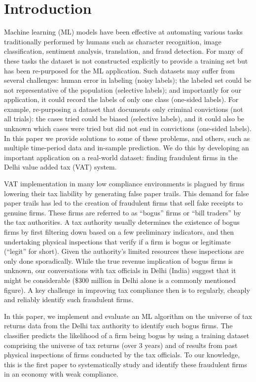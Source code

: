 \section{Introduction}
\label{sec:2-introduction}
Machine learning (ML) models have been effective at automating various tasks traditionally performed by humans such as character recognition, image classification, sentiment analysis, translation, and fraud detection. For many of these tasks the dataset is not constructed explicitly to provide a training set but has been re-purposed for the ML application. Such datasets may suffer from several challenges: human error in labeling (noisy labels); the labeled set could be not representative of the population (selective labels); and importantly for our application, it could record the labels of only one class (one-sided labels). For example, re-purposing a dataset that documents only criminal convictions (not all trials): the cases tried could be biased (selective labels), and it could also be unknown which cases were tried but did not end in convictions (one-sided labels). In this paper we provide solutions to some of these problems, and others, such as multiple time-period data and in-sample prediction. We do this by developing an important application on a real-world dataset: finding fraudulent firms in the Delhi value added tax (VAT) system.

VAT implementation in many low compliance environments is plagued by firms lowering their tax liability by generating false paper trails. This demand for false paper trails has led to the creation of fraudulent firms that sell fake receipts to genuine firms. These firms are referred to as ``bogus'' firms or ``bill traders'' by the tax authorities. A tax authority usually determines the existence of bogus firms by first filtering down based on a few preliminary indicators, and then undertaking physical inspections that verify if a firm is bogus or legitimate (``legit'' for short). Given the authority's limited resources these inspections are only done sporadically.  While the true revenue implication of bogus firms is unknown, our conversations with tax officials in Delhi (India) suggest that it might be considerable (\$300 million in Delhi alone is a commonly mentioned figure). A key challenge in improving tax compliance then is to regularly, cheaply and reliably identify such fraudulent firms. 

In this paper, we implement and evaluate an ML algorithm on the universe of tax returns data from the Delhi tax authority to identify such bogus firms. The classifier predicts the likelihood of a firm being bogus by using a training dataset comprising the universe of tax returns (over 3 years) and of results from past physical inspections of firms conducted by the tax officials. To our knowledge, this is the first paper to systematically study and identify these fraudulent firms in an economy with weak compliance.

